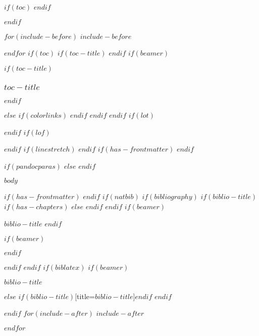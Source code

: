 \documentclass[
  $if(fontsize)$
    $fontsize$,
  $endif$
    $if(lang)$
    $babel-lang$,
  $endif$
    $if(papersize)$
    $papersize$paper,
  $endif$
    $if(beamer)$
    ignorenonframetext,
  $if(handout)$
    handout,
  $endif$
    $if(aspectratio)$
    aspectratio=$aspectratio$,
  $endif$
    $endif$
    $for(classoption)$
    $classoption$$sep$,
  $endfor$
    ]{$documentclass$}
\newif\ifbibliography
\begin{document}
$if(toc)$
{
\hypersetup{linkcolor=black}
\setcounter{tocdepth}{$toc-depth$}
\tableofcontents
}
$endif$

$endif$ %

$for(include-before)$
$include-before$

$endfor$
$if(toc)$
$if(toc-title)$
\renewcommand*\contentsname{$toc-title$}
$endif$
$if(beamer)$
\begin{frame}[allowframebreaks]
$if(toc-title)$
  \frametitle{$toc-title$}
$endif$
  \tableofcontents[hideallsubsections]
\end{frame}
$else$
{
$if(colorlinks)$
\hypersetup{linkcolor=$if(toccolor)$$toccolor$$else$$endif$}
$endif$
\setcounter{tocdepth}{$toc-depth$}
\tableofcontents
}
$endif$
$endif$
$if(lot)$
\listoftables
$endif$
$if(lof)$
\listoffigures
$endif$
$if(linestretch)$
$endif$
$if(has-frontmatter)$
\mainmatter
$endif$

$if(pandocparas)$
$else$
\setlength{\parindent}{16pt}
\setlength{\parskip}{0pt}
$endif$

$body$

$if(has-frontmatter)$
\backmatter
$endif$
$if(natbib)$
$if(bibliography)$
$if(biblio-title)$
$if(has-chapters)$
\renewcommand\bibname{$biblio-title$}
$else$
\renewcommand\refname{$biblio-title$}
$endif$
$endif$
$if(beamer)$
\begin{frame}[allowframebreaks]{$biblio-title$}
  \bibliographytrue
$endif$
  
$if(beamer)$
\end{frame}
$endif$

$endif$
$endif$
$if(biblatex)$
$if(beamer)$
\begin{frame}[allowframebreaks]{$biblio-title$}
  \bibliographytrue
  \printbibliography[heading=none]
\end{frame}
$else$
\printbibliography$if(biblio-title)$[title=$biblio-title$]$endif$
$endif$

$endif$
$for(include-after)$
$include-after$

$endfor$
\end{document}
